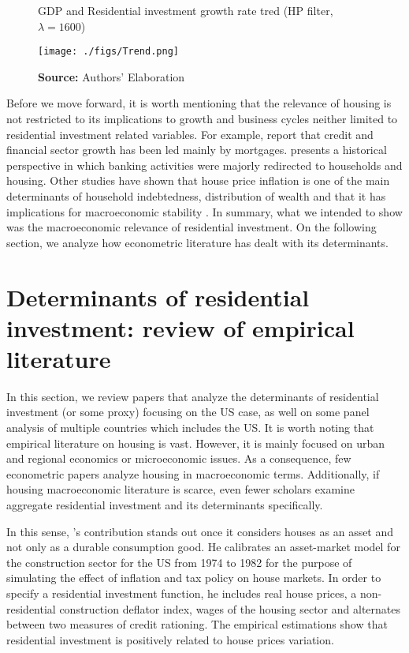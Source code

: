 \documentclass[12pt, a4paper]{article}
\begin{document}
\begin{figure}[H]
	\centering
	\caption{GDP and Residential investment growth rate tred (HP filter, $\lambda = 1600$)}
	\label{fig:trend}
	\texttt{[image: ./figs/Trend.png]}
	\caption*{\textbf{Source:} Authors' Elaboration}
\end{figure}


Before we move forward, it is worth mentioning that the relevance of housing is not restricted to its implications to growth and business cycles neither limited to residential investment related variables.
For example, \textcite{jorda_great_2016} report that credit and financial sector growth has been led mainly by mortgages. 
\textcite{kohl_more_2018} presents a historical perspective in which banking activities were majorly redirected to households and housing.
Other studies have shown that house price inflation is one of the main determinants of household indebtedness, distribution of wealth and that it has implications for macroeconomic stability \cites{ryoo_household_2015}{stockhammer_debt-driven_2016}{barnes_private_2016}{johnston_global_2017}{mian_household_2017}{anderson_politics_2020}{fuller_housing_2020}.
In summary, what we intended to show was the macroeconomic relevance of residential investment.
On the following section, we analyze how econometric literature has dealt with its determinants.
\section{Determinants of residential investment: review of empirical literature}
\label{sec:org8a92d27}
\label{sec:empirical_review}
In this section, we review papers that analyze the determinants of residential investment (or some proxy) focusing on the US case, as well on some panel analysis of multiple countries which includes the US.
It is worth noting that empirical literature on housing is vast.
However, it is mainly focused on urban and regional economics or microeconomic issues.
As a consequence, few econometric papers analyze housing in macroeconomic terms.
Additionally, if housing macroeconomic literature is scarce, even fewer scholars examine aggregate residential investment and its determinants specifically.

In this sense, \citeauthor*{poterba_tax_1984}'s \citeyear{poterba_tax_1984} contribution stands out once it considers houses as an asset and not only as a durable consumption good.
He calibrates an asset-market model for the construction sector for the US from 1974 to 1982 for the purpose of simulating the effect of inflation and tax policy on house markets.
In order to specify a residential investment function, he includes real house prices, a non-residential construction deflator index, wages of the housing sector and alternates between two measures  of  credit  rationing.
The empirical estimations show that residential investment is positively related to house prices variation.
\end{document}
